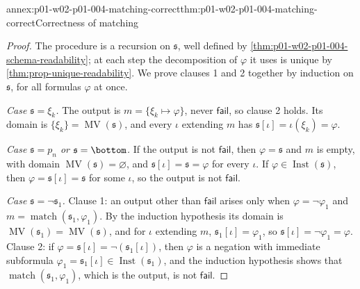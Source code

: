 \begin{annexitem}{annex:p01-w02-p01-004-matching-correct}{thm:p01-w02-p01-004-matching-correct}{Correctness of matching}
\begin{proof}
The procedure is a recursion on \(\mathfrak s\), well defined by
\cref{thm:p01-w02-p01-004-schema-readability}; at each step the decomposition
of \(\varphi\) it uses is unique by \cref{thm:prop-unique-readability}. We
prove clauses 1 and 2 together by induction on \(\mathfrak s\), for all
formulas \(\varphi\) at once.

\emph{Case \(\mathfrak s=\xi_k\).} The output is \(m=\{\xi_k\mapsto\varphi\}\),
never \(\mathsf{fail}\), so clause 2 holds. Its domain is
\(\{\xi_k\}=\operatorname{MV}(\mathfrak s)\), and every \(\iota\) extending
\(m\) has \(\mathfrak s[\iota]=\iota(\xi_k)=\varphi\).

\emph{Case \(\mathfrak s=p_n\) or \(\mathfrak s=\bottom\).} If the output is not
\(\mathsf{fail}\), then \(\varphi=\mathfrak s\) and \(m\) is empty, with domain
\(\operatorname{MV}(\mathfrak s)=\varnothing\), and \(\mathfrak
s[\iota]=\mathfrak s=\varphi\) for every \(\iota\). If
\(\varphi\in\operatorname{Inst}(\mathfrak s)\), then \(\varphi=\mathfrak
s[\iota]=\mathfrak s\) for some \(\iota\), so the output is not
\(\mathsf{fail}\).

\emph{Case \(\mathfrak s=\neg\mathfrak s_1\).} Clause 1: an output other than
\(\mathsf{fail}\) arises only when \(\varphi=\neg\varphi_1\) and
\(m=\operatorname{match}(\mathfrak s_1,\varphi_1)\). By the induction
hypothesis its domain is \(\operatorname{MV}(\mathfrak
s_1)=\operatorname{MV}(\mathfrak s)\), and for \(\iota\) extending \(m\),
\(\mathfrak s_1[\iota]=\varphi_1\), so
\(\mathfrak s[\iota]=\neg\varphi_1=\varphi\). Clause 2: if
\(\varphi=\mathfrak s[\iota]=\neg(\mathfrak s_1[\iota])\), then \(\varphi\) is
a negation with immediate subformula \(\varphi_1=\mathfrak s_1[\iota]\in
\operatorname{Inst}(\mathfrak s_1)\), and the induction hypothesis shows that
\(\operatorname{match}(\mathfrak s_1,\varphi_1)\), which is the output, is
not \(\mathsf{fail}\).


\end{proof}
\end{annexitem}
